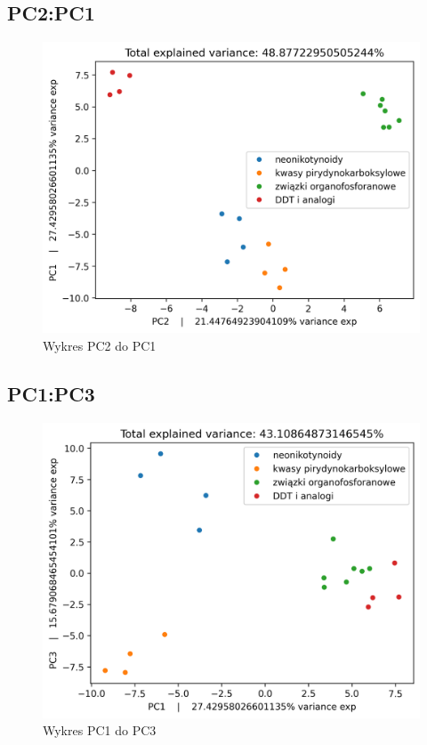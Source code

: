 \documentclass[12pt, a4paper]{article}
\begin{document}
    \subsection*{PC2:PC1}
        \begin{figure}[H]
            \centering
            \includegraphics{21.png}
            \caption{Wykres PC2 do PC1}
        \end{figure}

    \subsection*{PC1:PC3}
        \begin{figure}[H]
            \centering
            \includegraphics{13.png}
            \caption{Wykres PC1 do PC3}
        \end{figure}
\end{document}
